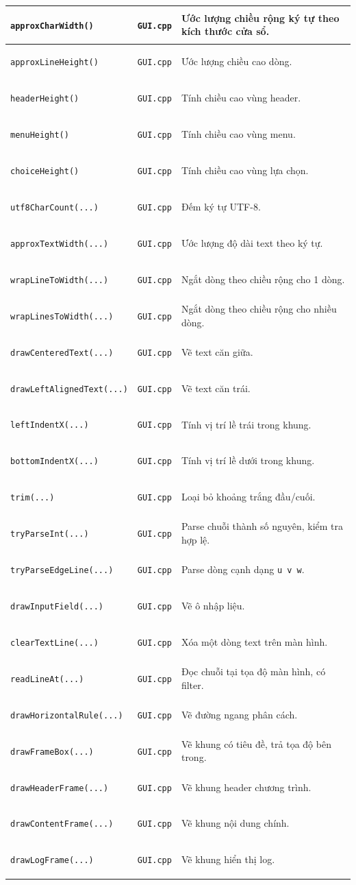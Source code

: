 \documentclass[14pt,a4paper]{report}
\begin{document}
\begin{longtable}{|>{\bfseries\raggedright\arraybackslash}p{}|
                   >{\bfseries\raggedright\arraybackslash}p{2.8cm}|
                   >{\raggedright\arraybackslash}p{}|}
\texttt{approxCharWidth()} & \texttt{GUI.cpp} & Ước lượng chiều rộng ký tự theo kích thước cửa sổ.\\ \hline
\texttt{approxLineHeight()} & \texttt{GUI.cpp} & Ước lượng chiều cao dòng.\\ \hline
\texttt{headerHeight()} & \texttt{GUI.cpp} & Tính chiều cao vùng header.\\ \hline
\texttt{menuHeight()} & \texttt{GUI.cpp} & Tính chiều cao vùng menu.\\ \hline
\texttt{choiceHeight()} & \texttt{GUI.cpp} & Tính chiều cao vùng lựa chọn.\\ \hline
\texttt{utf8CharCount(...)} & \texttt{GUI.cpp} & Đếm ký tự UTF-8.\\ \hline
\texttt{approxTextWidth(...)} & \texttt{GUI.cpp} & Ước lượng độ dài text theo ký tự.\\ \hline
\texttt{wrapLineToWidth(...)} & \texttt{GUI.cpp} & Ngắt dòng theo chiều rộng cho 1 dòng.\\ \hline
\texttt{wrapLinesToWidth(...)} & \texttt{GUI.cpp} & Ngắt dòng theo chiều rộng cho nhiều dòng.\\ \hline
\texttt{drawCenteredText(...)} & \texttt{GUI.cpp} & Vẽ text căn giữa.\\ \hline
\texttt{drawLeftAlignedText(...)} & \texttt{GUI.cpp} & Vẽ text căn trái.\\ \hline
\texttt{leftIndentX(...)} & \texttt{GUI.cpp} & Tính vị trí lề trái trong khung.\\ \hline
\texttt{bottomIndentX(...)} & \texttt{GUI.cpp} & Tính vị trí lề dưới trong khung.\\ \hline
\texttt{trim(...)} & \texttt{GUI.cpp} & Loại bỏ khoảng trắng đầu/cuối.\\ \hline
\texttt{tryParseInt(...)} & \texttt{GUI.cpp} & Parse chuỗi thành số nguyên, kiểm tra hợp lệ.\\ \hline
\texttt{tryParseEdgeLine(...)} & \texttt{GUI.cpp} & Parse dòng cạnh dạng \texttt{u v w}.\\ \hline
\texttt{drawInputField(...)} & \texttt{GUI.cpp} & Vẽ ô nhập liệu.\\ \hline
\texttt{clearTextLine(...)} & \texttt{GUI.cpp} & Xóa một dòng text trên màn hình.\\ \hline
\texttt{readLineAt(...)} & \texttt{GUI.cpp} & Đọc chuỗi tại tọa độ màn hình, có filter.\\ \hline
\texttt{drawHorizontalRule(...)} & \texttt{GUI.cpp} & Vẽ đường ngang phân cách.\\ \hline
\texttt{drawFrameBox(...)} & \texttt{GUI.cpp} & Vẽ khung có tiêu đề, trả tọa độ bên trong.\\ \hline
\texttt{drawHeaderFrame(...)} & \texttt{GUI.cpp} & Vẽ khung header chương trình.\\ \hline
\texttt{drawContentFrame(...)} & \texttt{GUI.cpp} & Vẽ khung nội dung chính.\\ \hline
\texttt{drawLogFrame(...)} & \texttt{GUI.cpp} & Vẽ khung hiển thị log.\\ \hline


\end{longtable}
\end{document}
